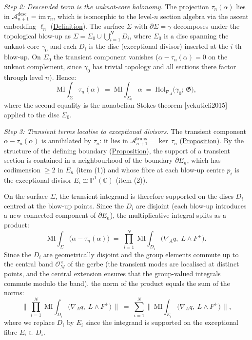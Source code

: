 \begin{theorem}
\emph{Step 2: Descended term is the unknot-core holonomy.}
The projection $\tau_n(\alpha)$ lies in
$\mathcal{A}_{n+1}^{\mathrm{desc}} = \mathrm{im}\,\tau_n$, which is
isomorphic to the level-$n$ section algebra via the ascent embedding
$\ell_n$ (\hyperref[def:descent-involution]{Definition}).  The surface
$\Sigma$ with $\partial\Sigma = \gamma$ decomposes under the topological
blow-up as $\Sigma = \Sigma_0 \cup \bigcup_{i=1}^N D_i$, where
$\Sigma_0$ is a disc spanning the unknot core $\gamma_0$ and each
$D_i$ is the disc (exceptional divisor) inserted at the $i$-th blow-up.
On $\Sigma_0$ the transient component vanishes
($\alpha - \tau_n(\alpha) = 0$ on the unknot complement, since $\gamma_0$
has trivial topology and all sections there factor through level $n$).
Hence:
\[
\mathrm{MI}\!\!\int_\Sigma \tau_n(\alpha)
  \;=\;
  \mathrm{MI}\!\!\int_{\Sigma_0} \alpha
  \;=\;
  \mathrm{Hol}_{\nabla_A}\!\bigl(\gamma_0;\, \mathfrak{G}\bigr),
\]
where the second equality is the nonabelian Stokes
theorem [yekutieli2015] applied to the disc $\Sigma_0$.

\emph{Step 3: Transient terms localise to exceptional divisors.}
The transient component $\alpha - \tau_n(\alpha)$ is annihilated by
$\tau_n$: it lies in
$\mathcal{A}_{n+1}^{\mathrm{trans}} = \ker\,\tau_n$
(\hyperref[prop:descent-eigenspaces]{Proposition}).  By the structure of the
defining boundary (\hyperref[prop:brane-boundary]{Proposition}), the support of
a transient section is contained in a neighbourhood of the boundary
$\partial E_n$, which has codimension $\geq 2$ in $E_n$ (item (1)) and
whose fibre at each blow-up centre $p_i$ is the exceptional divisor
$E_i \cong \mathbb{P}^1(\mathbb{C})$ (item (2)).

On the surface $\Sigma$, the transient integrand is therefore supported
on the discs $D_i$ centred at the blow-up points.  Since the $D_i$ are
disjoint (each blow-up introduces a new connected component of
$\partial E_n$), the multiplicative integral splits as a product:
\[
\mathrm{MI}\!\!\int_\Sigma
  \bigl(\alpha - \tau_n(\alpha)\bigr)
  \;=\;
  \prod_{i=1}^{N}\;
  \mathrm{MI}\!\!\int_{D_i}
  \bigl(\nabla_A q,\; L \wedge F^+\bigr).
\]
Since the $D_i$ are geometrically disjoint and the group elements commute
up to the central band $\mathcal{O}_M^{\times}$ of the gerbe
(the transient modes are localised at distinct points, and the central
extension ensures that the group-valued integrals commute modulo the
band), the norm of the product equals the sum of the norms:
\[
\bigl\lVert\,
  \prod_{i=1}^{N}\;
  \mathrm{MI}\!\!\int_{D_i}
  \bigl(\nabla_A q,\; L \wedge F^+\bigr)
  \,\bigr\rVert
  \;=\;
  \sum_{i=1}^{N}
  \bigl\lVert\,
  \mathrm{MI}\!\!\int_{E_i}
  \bigl(\nabla_A q,\; L \wedge F^+\bigr)
  \,\bigr\rVert,
\]
where we replace $D_i$ by $E_i$ since the integrand is supported on the
exceptional fibre $E_i \subset D_i$.


\end{theorem}

